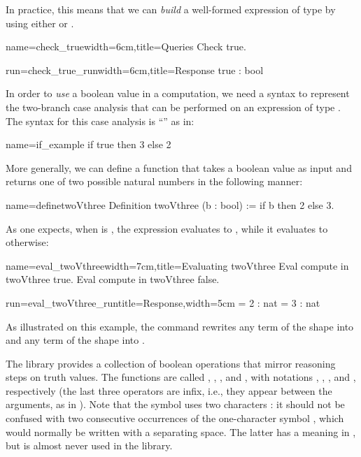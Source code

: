 
In practice, this means that we can \emph{build} a well-formed expression of
type  by using either  or .

\begin{coq}{name=check_true}{width=6cm,title=Queries}
Check true.
\end{coq}
\begin{coqout}{run=check_true_run}{width=6cm,title=Response}
true : bool
\end{coqout}

In order to \emph{use} a boolean value in a computation, we need a
syntax to represent the two-branch case analysis that can be performed
on an expression of type . The \Coq{} syntax for this case analysis is
``'' as in:

\begin{coq}{name=if_example}{}
if true then 3 else 2
\end{coq}
More generally, we can define a function that takes a boolean value as
input and returns one of two possible natural numbers in the following
manner:

\begin{coq}{name=definetwoVthree}{}
Definition twoVthree (b : bool) := if b then 2 else 3.
\end{coq}

As one expects, when  is , the expression
 evaluates to , while it evaluates to  otherwise:

\begin{coq}{name=eval_twoVthree}{width=7cm,title=Evaluating twoVthree}
Eval compute in twoVthree true.
Eval compute in twoVthree false.
\end{coq}
\begin{coqout}{run=eval_twoVthree_run}{title=Response,width=5cm}
  = 2 : nat
  = 3 : nat
\end{coqout}

As illustrated on this example,
the  command rewrites any term of the shape
 into  and any term of the shape
 into .

The \mcbMC{} library provides a collection of boolean operations that
mirror reasoning steps on truth values.  The functions are called
, , , and , with notations
\C{\~\~},  \C{||}, \C{&&}, and \C{==>}, respectively
(the last three operators are
infix, i.e., they appear between the arguments, as in ).
Note that the symbol \C{\~\~} uses two characters \C{\~}: it should
not be confused with two consecutive occurrences of the one-character symbol
\C{\~}, which would normally be written with a separating space.
The latter has a meaning in \Coq{}, but is almost never used
in the \mcbMC{} library.

